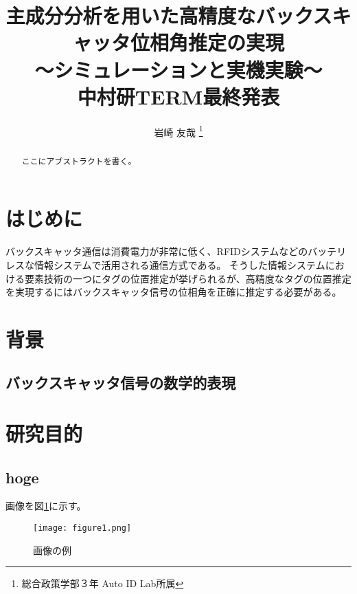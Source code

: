 \documentclass[a4j,10pt]{jsarticle}
\begin{document}

\title{
    主成分分析を用いた高精度なバックスキャッタ位相角推定の実現 \\
    〜シミュレーションと実機実験〜 \\
    中村研TERM最終発表
}



\author{
    岩崎 友哉 \thanks{総合政策学部３年 Auto ID Lab所属}
}

\begin{abstract}
ここにアブストラクトを書く。
\end{abstract}

\maketitle
\thispagestyle{empty}

\section{はじめに}

バックスキャッタ通信は消費電力が非常に低く、RFIDシステムなどのバッテリレスな情報システムで活用される通信方式である。
そうした情報システムにおける要素技術の一つにタグの位置推定\cite{1}が挙げられるが、高精度なタグの位置推定を実現するにはバックスキャッタ信号の位相角を正確に推定する必要がある。

\section{背景}

\subsection{バックスキャッタ信号の数学的表現}



\section{研究目的}

\subsection{hoge}
画像を図\ref{sample}に示す。

\begin{figure}[htbp]
    \begin{center}
        \texttt{[image: figure1.png]}
        \caption{画像の例}
        \label{sample}
    \end{center}
\end{figure}
 
\end{document}
